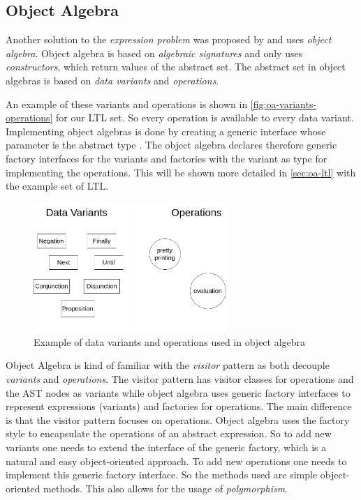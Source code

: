 \documentclass{llncs}
\begin{document}
\subsection{Object Algebra} \label{ssec:oa}
Another solution to the \emph{expression problem} was proposed by \cite{Oliveira12} and uses \emph{object algebra}. Object algebra is based on \emph{algebraic signatures} \cite{Guttag78} and only uses \emph{constructors}, which return values of the abstract set. The abstract set in object algebras is based on \emph{data variants} and \emph{operations}. 

An example of these variants and operations is shown in \autoref{fig:oa-variants-operations} for our LTL set. So every operation is available to every data variant. Implementing object algebras is done by creating a generic interface whose parameter is the abstract type \cite{Oliveira12}. The object algebra declares therefore generic factory interfaces for the variants and factories with the variant as type for implementing the operations. This will be shown more detailed in \autoref{sec:oa-ltl} with the example set of LTL.

\begin{figure}[h]
	\centering
	\includegraphics[width=0.65\textwidth]{img/OA-Variants-Operations}
	\caption{Example of data variants and operations used in object algebra}
	\label{fig:oa-variants-operations}
\end{figure} 

Object Algebra is kind of familiar with the \emph{visitor} pattern as both decouple \emph{variants} and \emph{operations}. The visitor pattern has visitor classes for operations and the AST nodes as variants while object algebra uses generic factory interfaces to represent expressions (variants) and factories for operations. The main difference is that the visitor pattern focuses on operations. Object algebra uses the factory style to encapsulate the operations of an abstract expression. So to add new variants one needs to extend the interface of the generic factory, which is a natural and easy object-oriented approach. To add new operations one needs to implement this generic factory interface. So the methods used are simple object-oriented methods. This also allows for the usage of \emph{polymorphism}.
\end{document}
